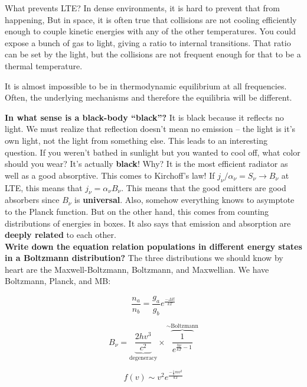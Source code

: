 \documentclass{article}
\begin{document}
What prevents LTE? In dense environments, it is hard to prevent that from happening, But in space, it is often true that collisions are not cooling efficiently enough to couple kinetic energies with any of the other temperatures. You could expose a bunch of gas to light, giving a ratio to internal transitions. That ratio can be set by the light, but the collisions are not frequent enough for that to be a thermal temperature. 

It is almost impossible to be in thermodynamic equilibrium at all frequencies. Often, the underlying mechanisms and therefore the equilibria will be different. 

\textbf{In what sense is a black-body ``black''?} It is black because it reflects no light. We must realize that reflection doesn't mean no emission -- the light is it's own light, not the light from something else. This leads to an interesting question. If you weren't bathed in sunlight but you wanted to cool off, what color should you wear? It's actually \textbf{black}! Why? It is the most efficient radiator as well as a good absorptive. This comes to Kirchoff's law! If $j_\nu / \alpha_\nu = S_\nu \rightarrow B_\nu$ at LTE, this means that $j_\nu = \alpha_\nu B_\nu$. This means that the good emitters are good absorbers since $B_\nu$ is \textbf{universal}. Also, somehow everything knows to asymptote to the Planck function. But on the other hand, this comes from counting distributions of energies in boxes. It also says that emission and absorption are \textbf{deeply related} to each other. \\

\textbf{Write down the equation relation populations in different energy states in a Boltzmann distribution?} The three distributions we should know by heart are the Maxwell-Boltzmann, Boltzmann, and Maxwellian. We have Boltzmann, Planck, and MB:

\begin{equation}
    \frac{n_a}{n_b} = \frac{g_a}{g_b} e^{\frac{-\Delta E}{kT}}
\end{equation}

\begin{equation}
    B_\nu = \underbrace{\frac{2hv^3}{c^2}}_{\text{degeneracy}} \times \overbrace{\frac{1}{e^{\frac{h \nu}{kT} - 1}}}^{\sim \text{Boltzmann}}
\end{equation}

\begin{equation}
    f(v)\sim v^2 e^{\frac{-\frac12 mv^2}{kT}}
\end{equation}
\end{document}

